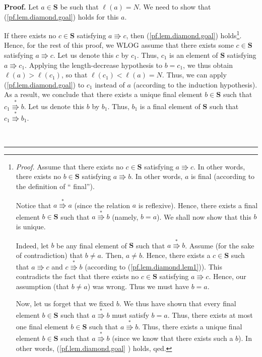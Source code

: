 \documentclass[numbers=enddot,12pt,final,onecolumn,notitlepage]{scrartcl}%
\theoremstyle{definition}
\newenvironment{proof}[1][Proof]{\noindent\textbf{#1.} }{\ \rule{0.5em}{0.5em}}
\begin{document}
\begin{proof}
Let $a\in\mathbf{S}$ be such that $\ell\left(  a\right)  =N$. We need to show
that (\ref{pf.lem.diamond.goal}) holds for this $a$.

If there exists no $c\in\mathbf{S}$ satisfying $a\Rrightarrow c$, then
(\ref{pf.lem.diamond.goal}) holds\footnote{\textit{Proof.} Assume that there
exists no $c\in\mathbf{S}$ satisfying $a\Rrightarrow c$. In other words, there
exists no $b\in\mathbf{S}$ satisfying $a\Rrightarrow b$. In other words, $a$
is final (according to the definition of \textquotedblleft
final\textquotedblright).
\par
Notice that $a\overset{\ast}{\Rrightarrow}a$ (since the relation $a$ is
reflexive). Hence, there exists a final element $b\in\mathbf{S}$ such that
$a\overset{\ast}{\Rrightarrow}b$ (namely, $b=a$). We shall now show that this
$b$ is unique.
\par
Indeed, let $b$ be any final element of $\mathbf{S}$ such that $a\overset{\ast
}{\Rrightarrow}b$. Assume (for the sake of contradiction) that $b\neq a$.
Then, $a\neq b$. Hence, there exists a $c\in\mathbf{S}$ such that
$a\Rrightarrow c$ and $c\overset{\ast}{\Rrightarrow}b$ (according to
(\ref{pf.lem.diamond.lem1})). This contradicts the fact that there exists no
$c\in\mathbf{S}$ satisfying $a\Rrightarrow c$. Hence, our assumption (that
$b\neq a$) was wrong. Thus we must have $b=a$.
\par
Now, let us forget that we fixed $b$. We thus have shown that every final
element $b\in\mathbf{S}$ such that $a\overset{\ast}{\Rrightarrow}b$ must
satisfy $b=a$. Thus, there exists at most one final element $b\in\mathbf{S}$
such that $a\overset{\ast}{\Rrightarrow}b$. Thus, there exists a unique final
element $b\in\mathbf{S}$ such that $a\overset{\ast}{\Rrightarrow}b$ (since we
know that there exists such a $b$). In other words, (\ref{pf.lem.diamond.goal}%
) holds, qed.}. Hence, for the rest of this proof, we WLOG assume that there
exists some $c\in\mathbf{S}$ satisfying $a\Rrightarrow c$. Let us denote this
$c$ by $c_{1}$. Thus, $c_{1}$ is an element of $\mathbf{S}$ satisfying
$a\Rrightarrow c_{1}$. Applying the length-decrease hypothesis to $b=c_{1}$,
we thus obtain $\ell\left(  a\right)  >\ell\left(  c_{1}\right)  $, so that
$\ell\left(  c_{1}\right)  <\ell\left(  a\right)  =N$. Thus, we can apply
(\ref{pf.lem.diamond.goal}) to $c_{1}$ instead of $a$ (according to the
induction hypothesis). As a result, we conclude that there exists a unique
final element $b\in\mathbf{S}$ such that $c_{1}\overset{\ast}{\Rrightarrow}b$.
Let us denote this $b$ by $b_{1}$. Thus, $b_{1}$ is a final element of
$\mathbf{S}$ such that $c_{1}\overset{\ast}{\Rrightarrow}b_{1}$.


\end{proof}
\end{document}
